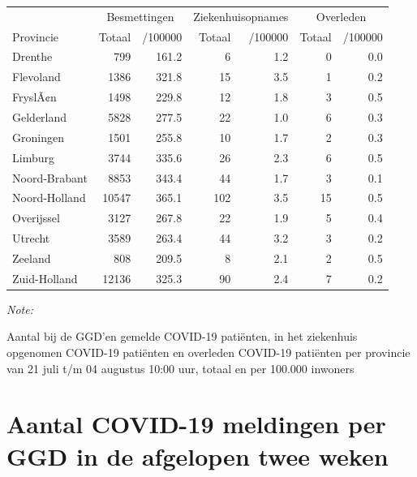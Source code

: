 \documentclass[
  english,
  man,floatsintext]{apa6}
\begin{document}
\begin{table}
\centering
\begin{threeparttable}
\begin{tabular}{lrrrrrr}
\toprule
\multicolumn{1}{c}{ } & \multicolumn{2}{c}{Besmettingen} & \multicolumn{2}{c}{Ziekenhuisopnames} & \multicolumn{2}{c}{Overleden} \\
\cmidrule(l{3pt}r{3pt}){2-3} \cmidrule(l{3pt}r{3pt}){4-5} \cmidrule(l{3pt}r{3pt}){6-7}
Provincie & Totaal & /100000 & Totaal & /100000 & Totaal & /100000\\
\midrule
Drenthe & 799 & 161.2 & 6 & 1.2 & 0 & 0.0\\
Flevoland & 1386 & 321.8 & 15 & 3.5 & 1 & 0.2\\
FryslÃ¢n & 1498 & 229.8 & 12 & 1.8 & 3 & 0.5\\
Gelderland & 5828 & 277.5 & 22 & 1.0 & 6 & 0.3\\
Groningen & 1501 & 255.8 & 10 & 1.7 & 2 & 0.3\\
Limburg & 3744 & 335.6 & 26 & 2.3 & 6 & 0.5\\
Noord-Brabant & 8853 & 343.4 & 44 & 1.7 & 3 & 0.1\\
Noord-Holland & 10547 & 365.1 & 102 & 3.5 & 15 & 0.5\\
Overijssel & 3127 & 267.8 & 22 & 1.9 & 5 & 0.4\\
Utrecht & 3589 & 263.4 & 44 & 3.2 & 3 & 0.2\\
Zeeland & 808 & 209.5 & 8 & 2.1 & 2 & 0.5\\
Zuid-Holland & 12136 & 325.3 & 90 & 2.4 & 7 & 0.2\\
\bottomrule
\end{tabular}
\begin{tablenotes}
\item \textit{Note: } 
\item Aantal bij de GGD’en gemelde COVID-19 patiënten, in het ziekenhuis opgenomen COVID-19 patiënten en overleden COVID-19 patiënten per provincie van 21 juli t/m 04 augustus 10:00 uur, totaal en per 100.000 inwoners
\end{tablenotes}
\end{threeparttable}
\end{table}

\newpage

\hypertarget{aantal-covid-19-meldingen-per-ggd-in-de-afgelopen-twee-weken}{%
\section{Aantal COVID-19 meldingen per GGD in de afgelopen twee weken}\label{aantal-covid-19-meldingen-per-ggd-in-de-afgelopen-twee-weken}}
\end{document}
